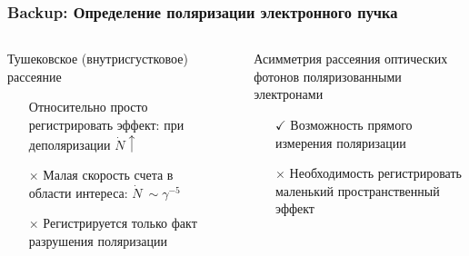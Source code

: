 \documentclass[12pt,aspectratio=169]{beamer}
\newcommand{\backupend}{
	\setcounter{framenumber}{\value{finalframe}}
}
\begin{document}
\begin{frame}[t]
	\frametitle{Backup: Определение поляризации электронного пучка}
	\begin{columns}[T]
		\begin{column}{0.49\linewidth}
			\begin{minipage}{1.\linewidth}
				\centering
				Тушековское (внутрисгустковое) рассеяние \\
				\small
				\flushleft
				
				\begin{itemize}
					\item[\textcolor{calmGreen}{\checkmark}] Относительно просто регистрировать эффект: при деполяризации $\dot{N}\uparrow$
					\item[\textcolor{calmRed}{$\times$}] Малая скорость счета в области интереса: $\dot{N}~\sim \gamma^{-5}$ 
					\item[\textcolor{calmRed}{$\times$}] Регистрируется только факт разрушения поляризации
				\end{itemize}
			\end{minipage}
		\end{column}
		\begin{column}{.01\linewidth}
			\rule{.1mm}{.6\textheight}
		\end{column}
		\begin{column}{0.49\linewidth}
			\begin{minipage}{1.\linewidth}
				\centering
				Асимметрия рассеяния оптических фотонов поляризованными электронами\\
				\small
				\begin{itemize}
					\item[\textcolor{calmGreen}{$\checkmark$}] Возможность прямого измерения поляризации
					\item[\textcolor{calmRed}{$\times$}] Необходимость регистрировать маленький пространственный эффект
				\end{itemize}
			\end{minipage} 
		\end{column}
	\end{columns}
	\centering
	\small
\end{frame}

\backupend
\end{document}
